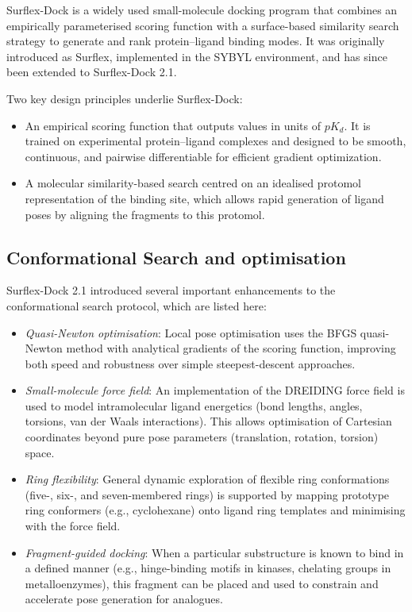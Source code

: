 \documentclass[12pt]{article}
\begin{document}
Surflex-Dock is a widely used small-molecule docking program that combines an empirically parameterised scoring function with a surface-based similarity search strategy to generate and rank protein--ligand binding modes\cite{CH7_Jain2003Surflex,CH7_Jain2007Surflex21}. It was originally introduced as Surflex\cite{CH7_Jain2003Surflex}, implemented in the SYBYL environment, and has since been extended to Surflex-Dock 2.1\cite{CH7_Jain2007Surflex21}.

Two key design principles underlie Surflex-Dock:
\begin{itemize}
  \item An empirical scoring function that outputs values in units of $pK_d$. It is trained on experimental protein--ligand complexes and designed to be smooth, continuous, and pairwise differentiable for efficient gradient optimization\cite{CH7_Jain2007Surflex21,CH7_Jain2006NegTrain}.
  \item A molecular similarity-based search centred on an idealised protomol representation of the binding site, which allows rapid generation of ligand poses by aligning the fragments to this protomol\cite{CH7_Jain2003Surflex}.
\end{itemize}

\subsection{Conformational Search and optimisation}

Surflex-Dock 2.1\cite{CH7_Jain2007Surflex21} introduced several important enhancements to the conformational search protocol, which are listed here:
\begin{itemize}
  \item \emph{Quasi-Newton optimisation}: Local pose optimisation uses the BFGS quasi-Newton method with analytical gradients of the scoring function, improving both speed and robustness over simple steepest-descent approaches.
  \item \emph{Small-molecule force field}: An implementation of the DREIDING force field\cite{CH7_mayo1990dreiding} is used to model intramolecular ligand energetics (bond lengths, angles, torsions, van der Waals interactions). This allows optimisation of Cartesian coordinates beyond pure pose parameters (translation, rotation, torsion) space.
  \item \emph{Ring flexibility}: General dynamic exploration of flexible ring conformations (five-, six-, and seven-membered rings) is supported by mapping prototype ring conformers (e.g., cyclohexane) onto ligand ring templates and minimising with the force field.
  \item \emph{Fragment-guided docking}: When a particular substructure is known to bind in a defined manner (e.g., hinge-binding motifs in kinases, chelating groups in metalloenzymes), this fragment can be placed and used to constrain and accelerate pose generation for analogues.
\end{itemize}
\end{document}

